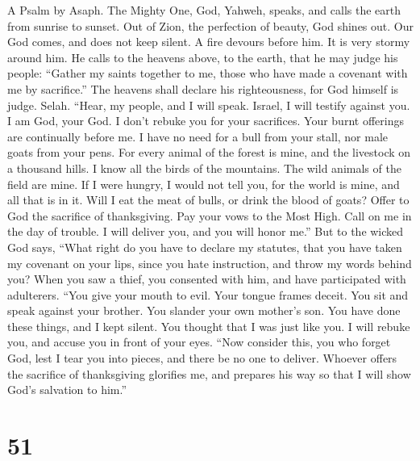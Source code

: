 A Psalm by Asaph.  The Mighty One, God, Yahweh, speaks,
and calls the earth from sunrise to sunset.  Out of Zion,
the perfection of beauty, God shines out.  Our God comes,
and does not keep silent. A fire devours before him. It is very stormy
around him.  He calls to the heavens above, to the earth,
that he may judge his people:  ``Gather my saints together
to me, those who have made a covenant with me by sacrifice.''
 The heavens shall declare his righteousness, for God
himself is judge. Selah.  ``Hear, my people, and I will
speak. Israel, I will testify against you. I am God, your God.
 I don't rebuke you for your sacrifices. Your burnt
offerings are continually before me.  I have no need for a
bull from your stall, nor male goats from your pens.  For
every animal of the forest is mine, and the livestock on a thousand
hills.  I know all the birds of the mountains. The wild
animals of the field are mine.  If I were hungry, I would
not tell you, for the world is mine, and all that is in it.
 Will I eat the meat of bulls, or drink the blood of
goats?  Offer to God the sacrifice of thanksgiving. Pay
your vows to the Most High.  Call on me in the day of
trouble. I will deliver you, and you will honor me.'' 
But to the wicked God says, ``What right do you have to declare my
statutes, that you have taken my covenant on your lips, 
since you hate instruction, and throw my words behind you?
 When you saw a thief, you consented with him, and have
participated with adulterers.  ``You give your mouth to
evil. Your tongue frames deceit.  You sit and speak
against your brother. You slander your own mother's son. 
You have done these things, and I kept silent. You thought that I was
just like you. I will rebuke you, and accuse you in front of your eyes.
 ``Now consider this, you who forget God, lest I tear you
into pieces, and there be no one to deliver.  Whoever
offers the sacrifice of thanksgiving glorifies me, and prepares his way
so that I will show God's salvation to him.''

\hypertarget{section-50}{%
\section{51}\label{section-50}}

